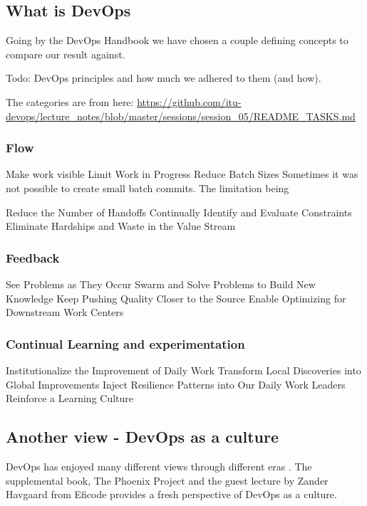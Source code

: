 \documentclass{article}
\begin{document}
\subsection{What is DevOps}

Going by the DevOps Handbook \cite{devopshandbook} we have chosen a couple defining concepts to compare our result against. 

Todo: DevOps principles and how much we adhered to them (and how).

The categories are from here:
\url{https://github.com/itu-devops/lecture_notes/blob/master/sessions/session_05/README_TASKS.md}

\subsubsection{Flow}

Make work visible
Limit Work in Progress
Reduce Batch Sizes
Sometimes it was not possible to create small batch commits. The limitation being 

    Reduce the Number of Handoffs
    Continually Identify and Evaluate Constraints
    Eliminate Hardships and Waste in the Value Stream



\subsubsection{Feedback}

    See Problems as They Occur
    Swarm and Solve Problems to Build New Knowledge
    Keep Pushing Quality Closer to the Source
    Enable Optimizing for Downstream Work Centers


\subsubsection{Continual Learning and experimentation}

    Institutionalize the Improvement of Daily Work
    Transform Local Discoveries into Global Improvements
    Inject Resilience Patterns into Our Daily Work
    Leaders Reinforce a Learning Culture


\subsection{Another view - DevOps as a culture}

DevOps has enjoyed many different views through different eras \cite{devopsviewsthrougheras}. The supplemental book, The Phoenix Project \cite{thephoenixproject} and the guest lecture by Zander Havgaard from Eficode provides a fresh perspective of DevOps as a culture. 
\end{document}
